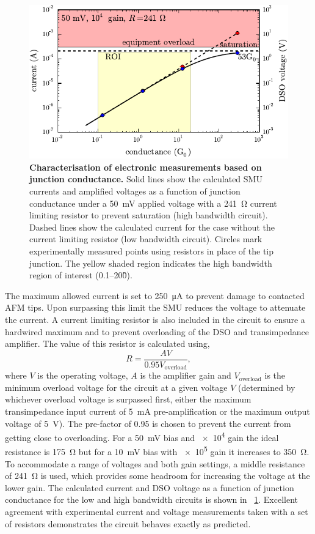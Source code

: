 \documentclass{article}
\begin{document}
\begin{figure}[bt]
\centering
\includegraphics{figures/hb_electronics_limits}
\caption[Characterisation of electronic measurements based on junction conductance.]{\textbf{Characterisation of electronic measurements based on junction conductance.} Solid lines show the calculated SMU currents and amplified voltages as a function of junction conductance under a \SI{50}{mV} applied voltage with a \SI{241}{\ohm} current limiting resistor to prevent saturation (high bandwidth circuit). Dashed lines show the calculated current for the case without the current limiting resistor (low bandwidth circuit). Circles mark experimentally measured points using resistors in place of the tip junction. The yellow shaded region indicates the high bandwidth region of interest (0.1--20\G0).}
\label{fig:hb_electronics_limits}
\end{figure}

The maximum allowed current is set to \SI{250}{\micro\ampere} to prevent damage to contacted AFM tips. Upon surpassing this limit the SMU reduces the voltage to attenuate the current. A current limiting resistor is also included in the circuit to ensure a hardwired maximum and to prevent overloading of the DSO and transimpedance amplifier. The value of this resistor is calculated using,
\begin{equation}
	R = \frac{AV}{0.95V_{\mathrm{overload}}},
\end{equation}
where $V$ is the operating voltage, $A$ is the amplifier gain and $V_{\mathrm{overload}}$ is the minimum overload voltage for the circuit at a given voltage $V$ (determined by whichever overload voltage is surpassed first, either the maximum transimpedance input current of \SI{5}{mA} pre-amplification or the maximum output voltage of \SI{5}{V}). The pre-factor of 0.95 is chosen to prevent the current from getting close to overloading. For a \SI{50}{mV} bias and \num{e4} gain the ideal resistance is \SI{175}{\ohm} but for a \SI{10}{mV} bias with \num{e5} gain it increases to \SI{350}{\ohm}. To accommodate a range of voltages and both gain settings, a middle resistance of \SI{241}{\ohm} is used, which provides some headroom for increasing the voltage at the lower gain. The calculated current and DSO voltage as a function of junction conductance for the low and high bandwidth circuits is shown in \figurename~\ref{fig:hb_electronics_limits}. Excellent agreement with experimental current and voltage measurements taken with a set of resistors demonstrates the circuit behaves exactly as predicted.
\end{document}
